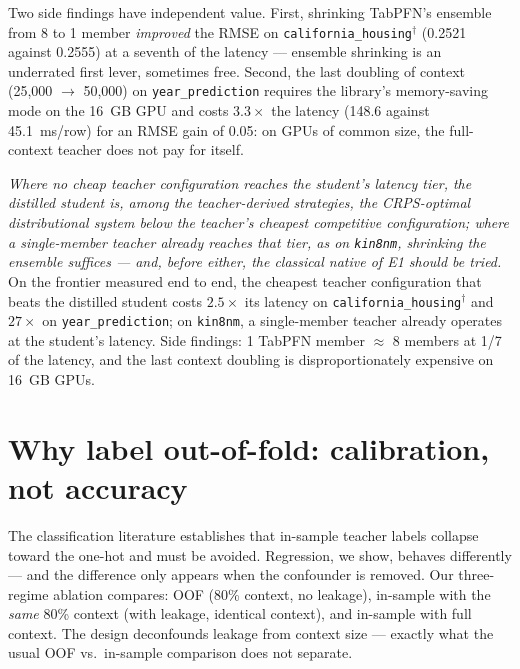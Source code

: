 Two side findings have independent value. First, shrinking TabPFN's
ensemble from 8 to 1 member \emph{improved} the RMSE on
\texttt{california\_\allowbreak housing}$^\dagger$ (0.2521 against
0.2555) at a seventh of the latency --- ensemble shrinking is an
underrated first lever, sometimes free. Second, the last doubling of
context (25{,}000 $\to$ 50{,}000) on
\texttt{year\_\allowbreak prediction} requires the library's
memory-saving mode on the 16~GB GPU and costs $3.3\times$ the
latency (148.6 against 45.1~ms/row) for an RMSE gain of 0.05: on
GPUs of common size, the full-context teacher does not pay for
itself.

\emph{Where no cheap teacher configuration reaches the student's
latency tier, the distilled student is, among the teacher-derived
strategies, the CRPS-optimal distributional system below the
teacher's cheapest competitive configuration; where a single-member
teacher already reaches that tier, as on \texttt{kin8nm}, shrinking
the ensemble suffices --- and, before either, the classical native
of E1 should be tried.} On the frontier measured end to end, the cheapest teacher
configuration that beats the distilled student costs $2.5\times$ its
latency on \texttt{california\_\allowbreak housing}$^\dagger$ and
$27\times$ on \texttt{year\_\allowbreak prediction}; on
\texttt{kin8nm}, a single-member teacher already
operates at the student's latency. Side findings: 1 TabPFN member
$\approx$ 8 members at 1/7 of the latency, and the last context
doubling is disproportionately expensive on 16~GB GPUs.

\section{Why label out-of-fold: calibration, not accuracy}
\label{sec:destil-oof}

The classification literature \citep{pocketfm2026} establishes that
in-sample teacher labels collapse toward the one-hot and must be
avoided. Regression, we show, behaves differently --- and the
difference only appears when the confounder is removed. Our
three-regime ablation compares: OOF (80\% context, no leakage),
in-sample with the \emph{same} 80\% context (with leakage, identical
context), and in-sample with full context. The design deconfounds
leakage from context size --- exactly what the usual OOF vs.\
in-sample comparison does not separate.

